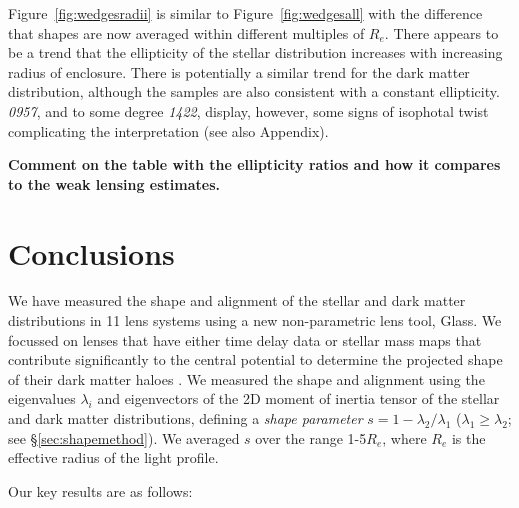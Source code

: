 \documentclass[useAMS,usenatbib]{mn2e}
\def\Glass{{\sc Glass}}
\begin{document}
Figure~\ref{fig:wedgesradii} is similar to Figure~\ref{fig:wedgesall} with the difference that shapes are now averaged within different multiples of $R_e$. There appears to be a trend that the ellipticity of the stellar distribution increases with increasing radius of enclosure. There is potentially a similar trend for the dark matter distribution, although the samples are also consistent with a constant ellipticity. {\it0957}, and to some degree {\it1422}, display, however, some signs of isophotal twist complicating the interpretation (see also Appendix).

\textbf{Comment on the table with the ellipticity ratios and how it compares to the weak lensing estimates.}


\section{Conclusions}\label{sec:conclusions}
We have measured the shape and alignment of the stellar and dark matter distributions in 11 lens systems using a new non-parametric lens tool, \Glass. We focussed on lenses that have either time delay data or stellar mass maps that contribute significantly to the central potential to determine the projected shape of their dark matter haloes \citep{2014MNRAS.445.2181C}. We measured the shape and alignment using the eigenvalues $\lambda_i$ and eigenvectors of the 2D moment of inertia tensor of the stellar and dark matter distributions, defining a {\it shape parameter} $s = 1 - \lambda_{2}/\lambda_{1}$ ($\lambda_{1} \geq \lambda_{2}$; see \S\ref{sec:shapemethod}). We averaged $s$ over the range 1-5$R_e$, where $R_e$ is the effective radius of the light profile.

Our key results are as follows:
\end{document}
